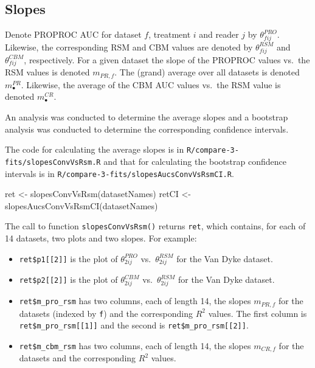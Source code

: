 \documentclass[
]{book}
\newenvironment{Shaded}{\begin{snugshade}}{\end{snugshade}}
\newcommand{\FunctionTok}[1]{\textcolor[rgb]{0.00,0.00,0.00}{#1}}
\newcommand{\NormalTok}[1]{#1}
\newcommand{\OtherTok}[1]{\textcolor[rgb]{0.56,0.35,0.01}{#1}}
\providecommand{\tightlist}{%
  \setlength{\itemsep}{0pt}\setlength{\parskip}{0pt}}
\begin{document}
\hypertarget{rsm-3-fits-slopes}{%
\subsection{Slopes}\label{rsm-3-fits-slopes}}

Denote PROPROC AUC for dataset \(f\), treatment \(i\) and reader \(j\) by \(\theta^{PRO}_{fij}\). Likewise, the corresponding RSM and CBM values are denoted by \(\theta^{RSM}_{fij}\) and \(\theta^{CBM}_{fij}\), respectively. For a given dataset the slope of the PROPROC values vs.~the RSM values is denoted \(m_{PR,f}\). The (grand) average over all datasets is denoted \(m^{PR}_\bullet\). Likewise, the average of the CBM AUC values vs.~the RSM value is denoted \(m^{CR}_\bullet\).

An analysis was conducted to determine the average slopes and a bootstrap analysis was conducted to determine the corresponding confidence intervals.

The code for calculating the average slopes is in \texttt{R/compare-3-fits/slopesConvVsRsm.R} and that for calculating the bootstrap confidence intervals is in \texttt{R/compare-3-fits/slopesAucsConvVsRsmCI.R}.

\begin{Shaded}
\begin{Highlighting}[]
\NormalTok{ret }\OtherTok{\textless{}{-}} \FunctionTok{slopesConvVsRsm}\NormalTok{(datasetNames)}
\NormalTok{retCI }\OtherTok{\textless{}{-}} \FunctionTok{slopesAucsConvVsRsmCI}\NormalTok{(datasetNames)}
\end{Highlighting}
\end{Shaded}

The call to function \texttt{slopesConvVsRsm()} returns \texttt{ret}, which contains, for each of 14 datasets, two plots and two slopes. For example:

\begin{itemize}
\tightlist
\item
  \texttt{ret\$p1{[}{[}2{]}{]}} is the plot of \(\theta^{PRO}_{2ij}\) vs.~\(\theta^{RSM}_{2ij}\) for the Van Dyke dataset.
\item
  \texttt{ret\$p2{[}{[}2{]}{]}} is the plot of \(\theta^{CBM}_{2ij}\) vs.~\(\theta^{RSM}_{2ij}\) for the Van Dyke dataset.
\item
  \texttt{ret\$m\_pro\_rsm} has two columns, each of length 14, the slopes \(m_{PR,f}\) for the datasets (indexed by \texttt{f}) and the corresponding \(R^2\) values. The first column is \texttt{ret\$m\_pro\_rsm{[}{[}1{]}{]}} and the second is \texttt{ret\$m\_pro\_rsm{[}{[}2{]}{]}}.
\item
  \texttt{ret\$m\_cbm\_rsm} has two columns, each of length 14, the slopes \(m_{CR,f}\) for the datasets and the corresponding \(R^2\) values.
\end{itemize}
\end{document}

